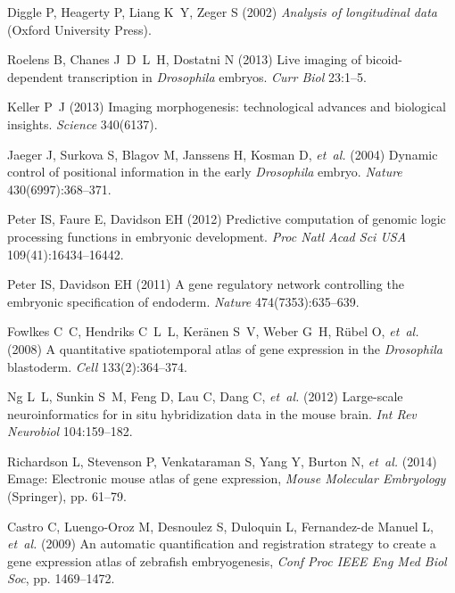 \documentclass{pnastwo}
\begin{document}
\begin{article}
\begin{thebibliography}{10}

Diggle P, Heagerty P, Liang K~Y, Zeger S (2002) \textit{Analysis of
  longitudinal data} (Oxford University Press).

Roelens B, Chanes J~D~L~H, Dostatni N (2013) Live imaging of bicoid-dependent
  transcription in \textit{{D}rosophila} embryos. \textit{Curr Biol}
  23:1--5.

Keller P~J (2013) Imaging morphogenesis: technological advances and biological
  insights. \textit{Science} 340(6137).

Jaeger J, Surkova S, Blagov M, Janssens H, Kosman D, \textit{et~al.} (2004)
  Dynamic control of positional information in the early \textit{{D}rosophila}
  embryo. \textit{Nature} 430(6997):368--371.

Peter IS, Faure E, Davidson EH (2012) Predictive computation of genomic logic processing functions in embryonic development. \textit{Proc Natl Acad Sci USA} 109(41):16434--16442.

Peter IS, Davidson EH (2011) A gene regulatory network controlling the embryonic
specification of endoderm. \textit{Nature} 474(7353):635--639.


Fowlkes C~C, Hendriks C~L~L, Ker{\"a}nen S~V, Weber G~H, R{\"u}bel O,
  \textit{et~al.} (2008) A quantitative spatiotemporal atlas of gene expression
  in the \textit{{D}rosophila} blastoderm. \textit{Cell} 133(2):364--374.

Ng L~L, Sunkin S~M, Feng D, Lau C, Dang C, \textit{et~al.} (2012) Large-scale
  neuroinformatics for in situ hybridization data in the mouse brain.
  \textit{Int Rev Neurobiol} 104:159--182.

Richardson L, Stevenson P, Venkataraman S, Yang Y, Burton N, \textit{et~al.}
  (2014) Emage: Electronic mouse atlas of gene expression, \textit{Mouse
  Molecular Embryology} (Springer), pp. 61--79.

Castro C, Luengo-Oroz M, Desnoulez S, Duloquin L, Fernandez-de Manuel L,
  \textit{et~al.} (2009) An automatic quantification and registration strategy
  to create a gene expression atlas of zebrafish embryogenesis,
  \textit{Conf Proc IEEE Eng Med Biol Soc}, pp. 1469--1472.


\end{thebibliography}
\end{article}
\end{document}
